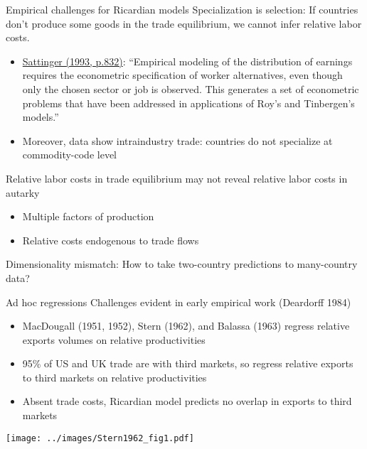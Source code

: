 \documentclass[11pt,notes=hide,aspectratio=169]{beamer}
\begin{document}
\begin{frame}{Empirical challenges for Ricardian models}
Specialization is selection:
If countries don't produce some goods in the trade equilibrium, 
we cannot infer relative labor costs.
\begin{itemize}
	\item {\scriptsize \href{https://www.jstor.org/stable/2728516}{Sattinger (1993, p.832)}: 
	``Empirical modeling of the distribution of earnings requires the econometric specification of worker alternatives, even though only the chosen sector or job is observed.
	This generates a set of econometric problems that have been addressed in applications of Roy's and Tinbergen's models.''\par}
	\item Moreover, data show intraindustry trade: countries do not specialize at commodity-code level
\end{itemize}
Relative labor costs in trade equilibrium may not reveal relative labor costs in autarky
\begin{itemize}
	\item Multiple factors of production
	\item Relative costs endogenous to trade flows
\end{itemize}
Dimensionality mismatch:
How to take two-country predictions to many-country data?
\end{frame}
\begin{frame}{Ad hoc regressions}
Challenges evident in early empirical work (Deardorff 1984)
\begin{itemize}
	\item MacDougall (1951, 1952), Stern (1962), and Balassa (1963) regress relative exports volumes on relative productivities
	\item 95\% of US and UK trade are with third markets, so regress relative exports to third markets on relative productivities
	\item Absent trade costs, Ricardian model predicts no overlap in exports to third markets
\end{itemize}
\begin{center}
\texttt{[image: ../images/Stern1962\_fig1.pdf]}
\end{center}
\end{frame}
\end{document}
